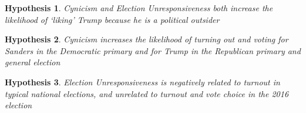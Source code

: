 \documentclass[12pt]{article}
\newtheorem{hyp}{Hypothesis}
\begin{document}
\begin{hyp}\label{hyp:candevals}
Cynicism and Election Unresponsiveness both increase the likelihood of `liking' Trump because he is a political outsider
\end{hyp}

\begin{hyp}\label{hyp:cyn-voting}
Cynicism increases the likelihood of turning out and voting for Sanders in the Democratic primary and for Trump in the Republican primary and general election
\end{hyp}

\begin{hyp}\label{hyp:elect-voting}
Election Unresponsiveness is negatively related to turnout in typical national elections, and unrelated to turnout and vote choice in the 2016 election
\end{hyp}


\end{document}
